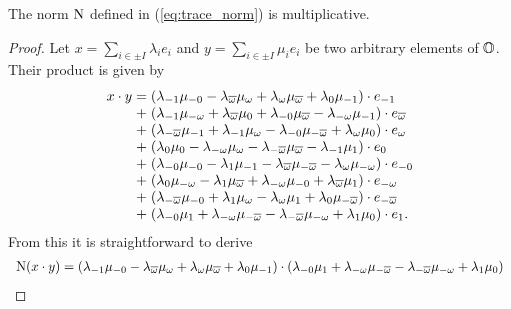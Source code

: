 \begin{lemma}
	\label{lemma:norm_multiplicative}
	The norm $\mathord{\mathrm{N}}$ defined in (\ref{eq:trace_norm}) is multiplicative.
\end{lemma}

\begin{proof}
	Let $x = \sum_{i \in \pm I} \lambda_i e_i$ and
	$y = \sum_{i \in \pm I} \mu_i e_i$ be two arbitrary elements of $\mathbb{O}$. Their product is
	given by
	\begin{equation*}
		\begin{array}{r@{\;}c@{\;}l}
			x \cdot y & = & (\lambda_{-1} \mu_{-0} - \lambda_{\bar{\omega}} \mu_{\omega}
				+ \lambda_{\omega} \mu_{\bar{\omega}} + \lambda_0 \mu_{-1}) \cdot e_{-1} \\
							
				&+ &   (\lambda_{-1} \mu_{-\omega} + \lambda_{\bar{\omega}} \mu_0 + 
			\lambda_{-0} \mu_{\bar{\omega}} - \lambda_{-\omega} \mu_{-1}) \cdot e_{\bar{\omega}}  \\
					
				&+ &   (\lambda_{-\bar{\omega}} \mu_{-1} + \lambda_{-1} \mu_{\omega} - 
						\lambda_{-0} \mu_{-\bar{\omega}} + \lambda_{\omega} \mu_0) \cdot e_{\omega} \\
					
				&+ &   (\lambda_0 \mu_0 - \lambda_{-\omega} \mu_{\omega} - 
				\lambda_{-\bar{\omega}} \mu_{\bar{\omega}} - \lambda_{-1} \mu_1) \cdot e_0 \\
						
				&+ &   (\lambda_{-0} \mu_{-0} - \lambda_1 \mu_{-1} - 
	\lambda_{\bar{\omega}} \mu_{-\bar{\omega}}-\lambda_{\omega}\mu_{-\omega}) \cdot e_{-0} \\
				
				&+ &   (\lambda_0 \mu_{-\omega} - \lambda_1 \mu_{\bar{\omega}} + \lambda_{-\omega}
			\mu_{-0} + \lambda_{\bar{\omega}} \mu_1) \cdot e_{-\omega} \\
				
				&+ &   (\lambda_{-\bar{\omega}} \mu_{-0} + \lambda_1 \mu_{\omega} - 
				\lambda_{\omega} \mu_1 + 
				\lambda_0 \mu_{-\bar{\omega}}) \cdot e_{-\bar{\omega}} \\
			
				&+ &   (\lambda_{-0} \mu_1 + \lambda_{-\omega} \mu_{-\bar{\omega}} - 
			\lambda_{-\bar{\omega}} \mu_{-\omega} + \lambda_1 \mu_0) \cdot e_1 .
		\end{array}
	\end{equation*}
	From this it is straightforward to derive
	\begin{equation*}
		\begin{array}{r@{\;}c@{\;}l}
			\NN(x\cdot y) & = &
						(\lambda_{-1} \mu_{-0} - \lambda_{\bar{\omega}} \mu_{\omega}
				+ \lambda_{\omega} \mu_{\bar{\omega}} + \lambda_0 \mu_{-1})\cdot
					(\lambda_{-0} \mu_1 + \lambda_{-\omega} \mu_{-\bar{\omega}} - 
			\lambda_{-\bar{\omega}} \mu_{-\omega} + \lambda_1 \mu_0) \\
			

\end{array}
\end{equation*}
\end{proof}
